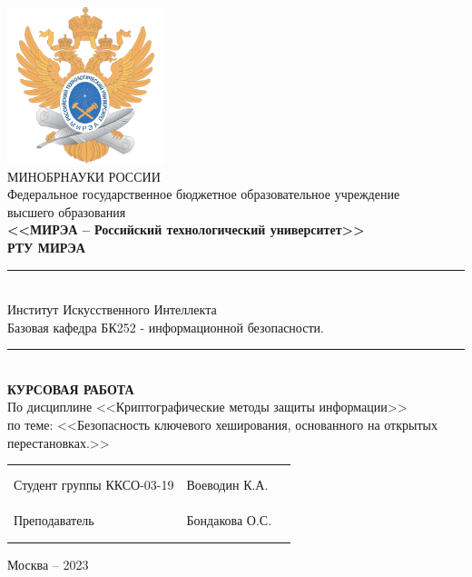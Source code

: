 \documentclass[utf8,14pt,a4paper,oneside,russian]{book}
\begin{document}
\thispagestyle{empty}
\small
\begin{center}
    \includegraphics[width=4.55cm]{logo_mirea}\\
    \MakeUppercase{Минобрнауки России}\\[1em]
    Федеральное государственное бюджетное образовательное учреждение\\
    высшего образования\\[0.5em]
    \textbf{<<МИРЭА -- Российский технологический университет>>}\\
    \textbf{РТУ МИРЭА}\\
    \rule{\textwidth}{0.75pt}\\
    Институт Искусственного Интеллекта\\
    Базовая кафедра БК252 - информационной безопасности.\\
    
    \rule{\textwidth}{0.75pt}\\[5em]
    \normalsize\MakeUppercase{\textbf{Курсовая работа}}\small\\[0.5em]
    По дисциплине <<Криптографические методы защиты информации>>\\[0.5em]
    по теме: <<Безопасность ключевого хеширования, основанного на открытых перестановках.>>\\[1.5em]
    \begin{tabular}{p{7cm}p{6cm}c}                    \\[-0.5em]
      &                & \\[1em]
        Студент группы ККСО-03-19 & Воеводин К.А.  & \rule{2cm}{0pt}                    \\[-0.5em]
                                  &                & \\[2em]
        Преподаватель             & Бондакова О.С.  & \rule{2cm}{0pt}                    \\[-0.5em]
                                  &                & \\[5em]
    \end{tabular}
    \vfill
    Москва -- 2023
\end{center}
\normalsize
\newpage
\end{document}
